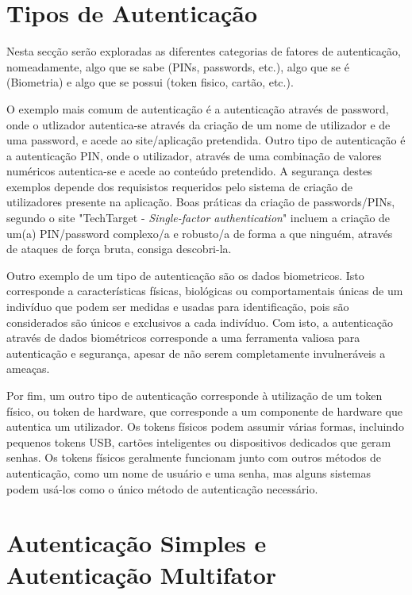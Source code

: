 \section{Tipos de Autenticação}

\hspace{1cm} Nesta secção serão exploradas as diferentes categorias de fatores de autenticação, nomeadamente, algo que se sabe (PINs, passwords, etc.), algo que se é (Biometria) e algo que se possui (token fisico, cartão, etc.). 

\hspace{1cm} O exemplo mais comum de autenticação é a autenticação através de password, onde o utlizador autentica-se através da criação de um nome de utilizador e de uma password, e acede ao site/aplicação pretendida. Outro tipo de autenticação é a autenticação PIN, onde o utilizador, através de uma combinação de valores numéricos autentica-se e acede ao conteúdo pretendido.
A segurança destes exemplos depende dos requisistos requeridos pelo sistema de criação de utilizadores presente na aplicação. Boas práticas da criação de passwords/PINs, segundo o site "TechTarget - \textit{Single-factor authentication}" incluem a criação de um(a) PIN/password complexo/a e robusto/a de forma a que ninguém, através de ataques de força bruta, consiga descobri-la.

\hspace{1cm} Outro exemplo de um tipo de autenticação são os dados biometricos. Isto corresponde a características físicas, biológicas ou comportamentais únicas de um indivíduo que podem ser medidas e usadas para identificação, pois são considerados são únicos e exclusivos a cada indivíduo. Com isto, a autenticação através de dados biométricos corresponde a uma ferramenta valiosa para autenticação e segurança, apesar de não serem completamente invulneráveis a ameaças.

\hspace{1cm} Por fim, um outro tipo de autenticação corresponde à utilização de um token físico, ou token de hardware, que corresponde a um componente de hardware que autentica um utilizador. 
Os tokens físicos podem assumir várias formas, incluindo pequenos tokens USB, cartões inteligentes ou dispositivos dedicados que geram senhas. Os tokens físicos geralmente funcionam junto com outros métodos de autenticação, como um nome de usuário e uma senha, mas alguns sistemas podem usá-los como o único método de autenticação necessário.

\section{Autenticação Simples e Autenticação Multifator}


